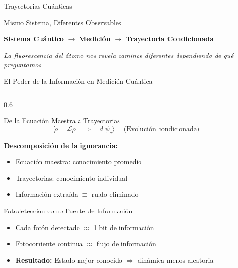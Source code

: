 \documentclass[10pt,xcolor=dvipsnames]{beamer}
\begin{document}
\begin{frame}{Trayectorias Cuánticas}
    \vspace{0.5cm}
    
    \begin{block}{Mismo Sistema, Diferentes Observables}
        \begin{center}
            \textbf{Sistema Cuántico} $\rightarrow$ \textbf{Medición} $\rightarrow$ \textbf{Trayectoria Condicionada}
            
            \vspace{0.2cm}
            \small\textit{La fluorescencia del átomo nos revela caminos diferentes dependiendo de qué preguntamos}
        \end{center}
    \end{block}
\end{frame}

\begin{frame}{El Poder de la Información en Medición Cuántica}
    \begin{columns}[T]
        \begin{column}{0.6\textwidth}
            \begin{block}{De la Ecuación Maestra a Trayectorias}
                \[
                \dot{\rho} = \mathcal{L}\rho \quad \Rightarrow \quad d|\psi_c\rangle = \text{(Evolución condicionada)}
                \]
                
                \textbf{Descomposición de la ignorancia:}
                \begin{itemize}
                    \item Ecuación maestra: conocimiento promedio
                    \item Trayectorias: conocimiento individual
                    \item Información extraída $\equiv$ ruido eliminado
                \end{itemize}
            \end{block}
            
            \begin{exampleblock}{Fotodetección como Fuente de Información}
                \begin{itemize}
                    \item Cada fotón detectado $\approx$ 1 bit de información
                    \item Fotocorriente continua $\approx$ flujo de información
                    \item \textbf{Resultado:} Estado mejor conocido $\Rightarrow$ dinámica menos aleatoria
                \end{itemize}
            \end{exampleblock}
        \end{column}
        

\end{columns}
\end{frame}
\end{document}
